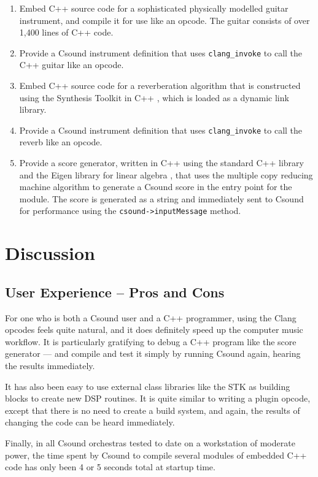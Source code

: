 \documentclass[letterpaper, 12pt]{article}
\begin{document}
\begin{enumerate}
\item Embed C++ source code for a sophisticated physically modelled guitar instrument, and compile it for use like an opcode. The guitar consists of over 1,400 lines of C++ code.
\item Provide a Csound instrument definition that uses \verb|clang_invoke| to call the C++ guitar like an opcode.
\item Embed C++ source code for a reverberation algorithm that is constructed using the Synthesis Toolkit in C++ \citep{thestk, stkbook}, which is loaded as a dynamic link library.
\item Provide a Csound instrument definition that uses \verb|clang_invoke| to call the reverb like an opcode.
\item Provide a score generator, written in C++ using the standard C++ library and the Eigen library for linear algebra \citep{eigen3}, that uses the multiple copy reducing machine algorithm \citep{chaosandfractals} to generate a Csound score in the entry point for the module. The score is generated as a string and immediately sent to Csound for performance using the \verb|csound->inputMessage| method.
\end{enumerate}

\section{Discussion}

\subsection{User Experience -- Pros and Cons}

For one who is both a Csound user and a C++ programmer, using the Clang opcodes feels quite natural, and it does definitely speed up the computer music workflow. It is particularly gratifying to debug a C++ program like the score generator --- and compile and test it simply by running Csound again, hearing the results immediately.

It has also been easy to use external class libraries like the STK \citep{thestk} as building blocks to create new DSP routines. It is quite similar to writing a plugin opcode, except that there is no need to create a build system, and again, the results of changing the code can be heard immediately.

Finally, in all Csound orchestras tested to date on a workstation of moderate power, the time spent by Csound to compile several modules of embedded C++ code has only been 4 or 5 seconds total at startup time.
\end{document}
